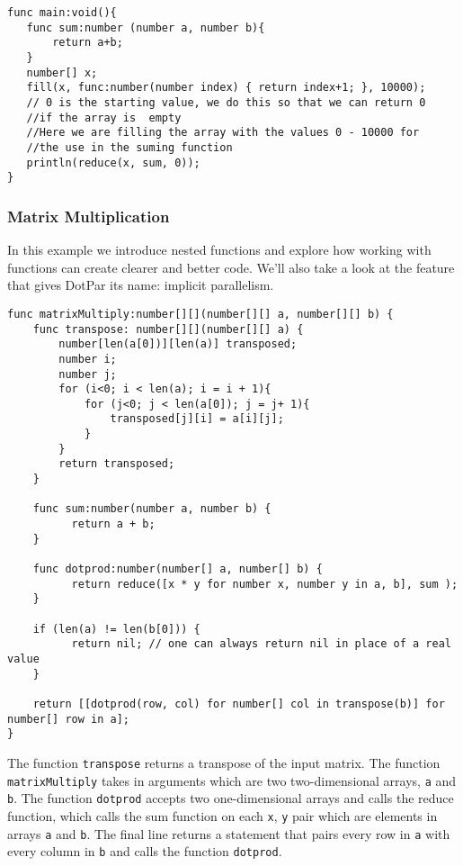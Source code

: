 \begin{verbatim}
func main:void(){
   func sum:number (number a, number b){
       return a+b;
   }
   number[] x;
   fill(x, func:number(number index) { return index+1; }, 10000);
   // 0 is the starting value, we do this so that we can return 0 
   //if the array is  empty
   //Here we are filling the array with the values 0 - 10000 for 
   //the use in the suming function
   println(reduce(x, sum, 0));
}
\end{verbatim}

\subsubsection{Matrix Multiplication}
In this example we introduce nested functions and explore how working with functions can create clearer and better code. We'll also take a look at the feature that gives DotPar its name: implicit parallelism.

\begin{verbatim}
func matrixMultiply:number[][](number[][] a, number[][] b) {
    func transpose: number[][](number[][] a) {
        number[len(a[0])][len(a)] transposed;
        number i;
        number j;
        for (i<0; i < len(a); i = i + 1){
            for (j<0; j < len(a[0]); j = j+ 1){
                transposed[j][i] = a[i][j];
            }
        }
        return transposed;
    }

    func sum:number(number a, number b) {
          return a + b;
    }
    
    func dotprod:number(number[] a, number[] b) {
          return reduce([x * y for number x, number y in a, b], sum );
    }
    
    if (len(a) != len(b[0])) {
          return nil; // one can always return nil in place of a real value
    }
    
    return [[dotprod(row, col) for number[] col in transpose(b)] for number[] row in a];
}
\end{verbatim}

The function \verb=transpose= returns a transpose of the input matrix. The function \verb=matrixMultiply= takes in arguments which are two two-dimensional arrays, \verb=a= and \verb=b=. The function \verb=dotprod= accepts two one-dimensional arrays and calls the reduce function, which calls the sum function on each \verb=x=, \verb=y= pair which are elements in arrays \verb=a= and \verb=b=. The final line returns a statement that pairs every row in \verb=a= with every column in \verb=b= and calls the function \verb=dotprod=.


